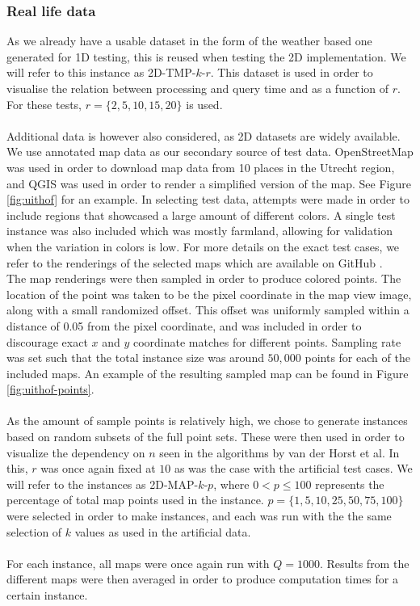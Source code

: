 \documentclass{article}
\newcommand{\fb}[1]{{#1}}
\begin{document}
\subsubsection*{Real life data}
\fb{As we already have a usable dataset in the form of the weather based one generated for 1D testing, this is reused when testing the 2D implementation. We will refer to this instance as 2D-TMP-$k$-$r$. This dataset is used in order to visualise the relation between processing and query time and as a function of $r$. For these tests, $r = \{ 2, 5, 10, 15, 20 \}$ is used.} \\\\
Additional data is however also considered, as 2D datasets are widely available. We use annotated map data as our secondary source of test data. OpenStreetMap \cite{OpenStreetMap} was used in order to download map data from 10 places in the Utrecht region, and QGIS \cite{QGIS_software} was used in order to render a simplified version of the map. See Figure \ref{fig:uithof} for an example. In selecting test data, attempts were made in order to include regions that showcased a large amount of different colors. A single test instance was also included which was mostly farmland, allowing for validation when the variation in colors is low. For more details on the exact test cases, we refer to the renderings of the selected maps which are available on GitHub \cite{vanderPlasImplementation}. \\
The map renderings were then sampled in order to produce colored points. The location of the point was taken to be the pixel coordinate in the map view image, along with a small randomized offset. This offset was uniformly sampled within a distance of 0.05 from the pixel coordinate, and was included in order to discourage exact $x$ and $y$ coordinate matches for different points. Sampling rate was set such that the total instance size was around $50,000$ points for each of the included maps. An example of the resulting sampled map can be found in Figure \ref{fig:uithof-points}. \\\\
\fb{As the amount of sample points is relatively high, we chose to generate instances based on random subsets of the full point sets. These were then used in order to visualize the dependency on $n$ seen in the algorithms by van der Horst et al. In this, $r$ was once again fixed at $10$ as was the case with the artificial test cases. We will refer to the instances as 2D-MAP-$k$-$p$, where $0 < p \leq 100$ represents the percentage of total map points used in the instance. $p=\{ 1, 5, 10, 25, 50, 75, 100 \}$ were selected in order to make instances, and each was run with the the same selection of $k$ values as used in the artificial data.} \\\\
\fb{For each instance, all maps were once again run with $Q=1000$. Results from the different maps were then averaged in order to produce computation times for a certain instance.}
\end{document}
